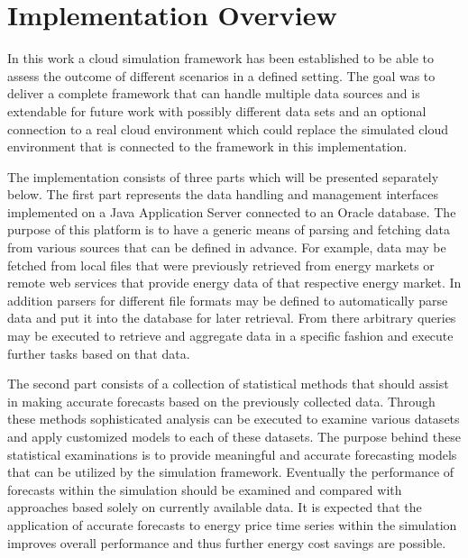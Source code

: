 

\section{Implementation Overview}

In this work a cloud simulation framework has been established to be able to assess the outcome of different scenarios in a defined setting. The goal was to deliver a complete framework that can handle multiple data sources and is extendable for future work with possibly different data sets and an optional connection to a real cloud environment which could replace the simulated cloud environment that is connected to the framework in this implementation. 

The implementation consists of three parts which will be presented separately below. The first part represents the data handling and management interfaces implemented on a Java Application Server connected to an Oracle database. The purpose of this platform is to have a generic means of parsing and fetching data from various sources that can be defined in advance. For example, data may be fetched from local files that were previously retrieved from energy markets or remote web services that provide energy data of that respective energy market. In addition parsers for different file formats may be defined to automatically parse data and put it into the database for later retrieval. From there arbitrary queries may be executed to retrieve and aggregate data in a specific fashion and execute further tasks based on that data. 

The second part consists of a collection of statistical methods that should assist in making accurate forecasts based on the previously collected data. Through these methods sophisticated analysis can be executed to examine various datasets and apply customized models to each of these datasets. The purpose behind these statistical examinations is to provide meaningful and accurate forecasting models that can be utilized by the simulation framework. Eventually the performance of forecasts within the simulation should be examined and compared with approaches based solely on currently available data. It is expected that the application of accurate forecasts to energy price time series within the simulation improves overall performance and thus further energy cost savings are possible. 

